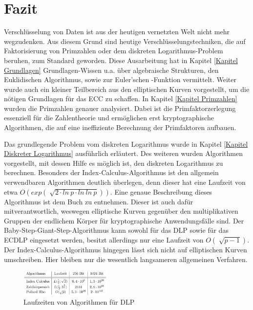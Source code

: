 \section{Fazit}
	Verschlüsselung von Daten ist aus der heutigen vernetzten Welt nicht mehr wegzudenken. Aus diesem Grund sind heutige Verschlüsselungstechniken, die auf Faktorisierung von Primzahlen oder dem diskreten Logarithmus-Problem beruhen, zum Standard geworden. Diese Ausarbeitung hat in Kapitel \ref{Kapitel Grundlagen} Grundlagen-Wissen u.a. über algebraische Strukturen, den Euklidischen Algorithmus, sowie zur Euler’schen \myPhi -Funktion vermittelt. Weiter wurde auch ein kleiner Teilbereich aus den elliptischen Kurven vorgestellt, um die nötigen Grundlagen für das ECC zu schaffen. In Kapitel \ref{Kapitel Primzahlen} wurden die Primzahlen genauer analysiert. Dabei ist die Primfaktorzerlegung essenziell für die Zahlentheorie und ermöglichen erst kryptographische Algorithmen, die auf eine ineffiziente Berechnung der Primfaktoren aufbauen.
	
	Das grundlegende Problem vom diskreten Logarithmus wurde in Kapitel \ref{Kapitel Diskreter Logarithmus} ausführlich erläutert. Des weiteren wurden Algorithmen vorgestellt, mit dessen Hilfe es möglich ist, den diskreten Logarithmus zu berechnen. Besonders der Index-Calculus-Algorithmus ist den allgemein verwendbaren Algorithmen deutlich überlegen, denn dieser hat eine Laufzeit von etwa $O(exp(\sqrt[]{2 \cdot ln~p \cdot ln~ln~p}))$. Eine genaue Beschreibung dieses Algorithmus ist dem Buch \cite{Einfuehrung:in:die:Kryptographie} zu entnehmen. Dieser ist auch dafür mitverantwortlich, weswegen elliptische Kurven gegenüber den multiplikativen Gruppen der endlichem Körper für kryptographische Anwendungsfälle  sind. Der Baby-Step-Giant-Step-Algorithmus kann sowohl für das DLP sowie für das ECDLP eingesetzt werden, besitzt allerdings nur eine Laufzeit von $O(\sqrt[]{p-1})$. Der Index-Calculus-Algorithmus hingegen lässt sich nicht auf elliptischen Kurven umschreiben. Hier bleiben nur die wesentlich langsameren allgemeinen Verfahren.\cite{Mathematisch:fuer:fortgeschrittene:Anfaenger}

	\begin{figure}
		\centering
		\includegraphics[width=0.4\textwidth]{includes/images/LaufzeitenDLP.PNG}
		\caption{Laufzeiten von Algorithmen für DLP~\cite{DLP:ECDLP:Probleme:und:Loesungen}}
		\label{fig_LaufzeitenDLP}
	\end{figure}
	
